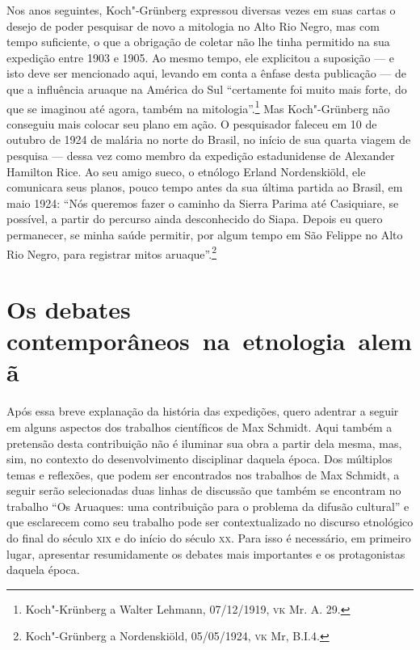 Nos anos seguintes, Koch"-Grünberg expressou diversas vezes em suas
cartas o desejo de poder pesquisar de novo a mitologia no Alto Rio
Negro, mas com tempo suficiente, o que a obrigação de coletar não lhe
tinha permitido na sua expedição entre 1903 e 1905. Ao mesmo tempo, ele
explicitou a suposição --- e isto deve ser mencionado aqui, levando em
conta a ênfase desta publicação --- de que a influência aruaque na
América do Sul ``certamente foi muito mais forte, do que se imaginou até
agora, também na mitologia''.\footnote{Koch"-Krünberg a Walter Lehmann,
  07/12/1919, \textsc{vk} Mr. A. 29.} Mas Koch"-Grünberg não conseguiu mais
colocar seu plano em ação. O pesquisador faleceu em 10 de outubro de
1924 de malária no norte do Brasil, no início de sua quarta viagem de
pesquisa --- dessa vez como membro da expedição estadunidense de
Alexander Hamilton Rice. Ao seu amigo sueco, o etnólogo
Erland Nordenskiöld, ele comunicara seus planos, pouco tempo
antes da sua última partida ao Brasil, em maio 1924: ``Nós queremos
fazer o caminho da Sierra Parima até Casiquiare, se possível, a partir
do percurso ainda desconhecido do Siapa. Depois eu quero permanecer, se
minha saúde permitir, por algum tempo em São Felippe no Alto Rio Negro,
para registrar mitos aruaque''.\footnote{Koch"-Grünberg a Nordenskiöld,
  05/05/1924, \textsc{vk} Mr, B.I.4.}

\section{Os debates contemporâneos~na~etnologia~alemã}
Após essa breve explanação da história das expedições, quero adentrar a
seguir em alguns aspectos dos trabalhos científicos de Max Schmidt.
Aqui também a pretensão desta contribuição não é iluminar sua obra a
partir dela mesma, mas, sim, no contexto do desenvolvimento disciplinar
daquela época. Dos múltiplos temas e reflexões, que podem ser
encontrados nos trabalhos de Max Schmidt, a seguir serão selecionadas
duas linhas de discussão que também se encontram no trabalho ``Os
Aruaques: uma contribuição para o problema da difusão cultural'' e que
esclarecem como seu trabalho pode ser contextualizado no discurso
etnológico do final do século \textsc{xix} e do início do século \textsc{xx}. Para isso é
necessário, em primeiro lugar, apresentar resumidamente os debates mais
importantes e os protagonistas daquela época.


